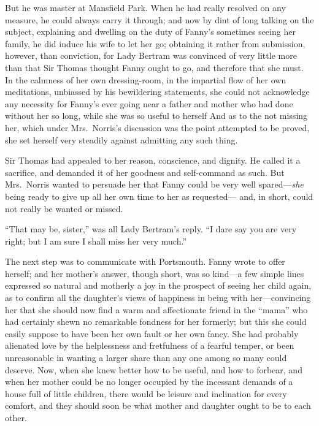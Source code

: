 But he was master at Mansfield Park.  When he had really
resolved on any measure, he could always carry it through;
and now by dint of long talking on the subject,
explaining and dwelling on the duty of Fanny's sometimes
seeing her family, he did induce his wife to let her go;
obtaining it rather from submission, however, than conviction,
for Lady Bertram was convinced of very little more than
that Sir Thomas thought Fanny ought to go, and therefore
that she must.  In the calmness of her own dressing-room,
in the impartial flow of her own meditations, unbiassed by
his bewildering statements, she could not acknowledge any
necessity for Fanny's ever going near a father and mother
who had done without her so long, while she was so useful
to herself And as to the not missing her, which under
Mrs.\ Norris's discussion was the point attempted to be proved,
she set herself very steadily against admitting any such thing.

Sir Thomas had appealed to her reason, conscience, and dignity.
He called it a sacrifice, and demanded it of her goodness
and self-command as such.  But Mrs.\ Norris wanted to persuade
her that Fanny could be very well spared---\emph{she} being
ready to give up all her own time to her as requested---%
and, in short, could not really be wanted or missed.

``That may be, sister,'' was all Lady Bertram's reply.
``I dare say you are very right; but I am sure I shall miss
her very much.''

The next step was to communicate with Portsmouth.  Fanny wrote
to offer herself; and her mother's answer, though short,
was so kind---a few simple lines expressed so natural and
motherly a joy in the prospect of seeing her child again,
as to confirm all the daughter's views of happiness in
being with her---convincing her that she should now find
a warm and affectionate friend in the ``mama'' who had
certainly shewn no remarkable fondness for her formerly;
but this she could easily suppose to have been her own
fault or her own fancy.  She had probably alienated love
by the helplessness and fretfulness of a fearful temper,
or been unreasonable in wanting a larger share than
any one among so many could deserve.  Now, when she
knew better how to be useful, and how to forbear,
and when her mother could be no longer occupied by the
incessant demands of a house full of little children,
there would be leisure and inclination for every comfort,
and they should soon be what mother and daughter ought
to be to each other.

